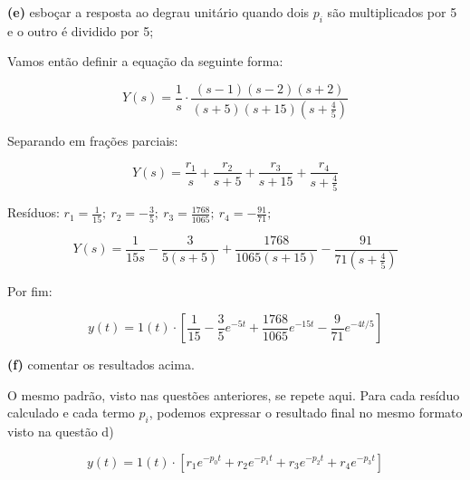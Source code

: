 \documentclass{article}
\begin{document}
\vspace{\baselineskip}

\textbf{(e)} esboçar a resposta ao degrau unitário quando dois $p_i$ são multiplicados por 5 e o outro é dividido por 5;

Vamos então definir a equação da seguinte forma:

\[ Y(s) = \frac{1}{s} \cdot \frac{(s-1)(s-2)(s+2)}{(s+5)(s+15)(s+ \frac{4}{5})} \]

Separando em frações parciais:

\[ Y(s) = \frac{r_1}{s} + \frac{r_2}{s+5} + \frac{r_3}{s+15} + \frac{r_4}{s+ \frac{4}{5}} \]

\vspace{\baselineskip}

Resíduos: $ r_1 = \frac{1}{15}; \ r_2 = -\frac{3}{5}; \ r_3 = \frac{1768}{1065}; \ r_4 = -\frac{91}{71}; $

\[ Y(s) = \frac{1}{15s} - \frac{3}{5(s+5)} + \frac{1768}{1065(s+15)} - \frac{91}{71(s+ \frac{4}{5})} \]

Por fim:

\[ y(t) = 1(t) \cdot \left[ \frac{1}{15} - \frac{3}{5}e^{-5t} + \frac{1768}{1065}e^{-15t} - \frac{9}{71}e^{-4t/5} \right] \]

\vspace{\baselineskip}

\textbf{(f)} comentar os resultados acima.

\vspace{\baselineskip}

O mesmo padrão, visto nas questões anteriores, se repete aqui. 
Para cada resíduo calculado e cada termo $ p_i $, podemos expressar o resultado final 
no mesmo formato visto na questão d)

\[ y(t) = 1(t) \cdot \left[ r_1 e^{-p_0 t} + r_2 e^{-p_1 t} + r_3 e^{-p_2 t} + r_4 e^{-p_3 t} \right]\]
\end{document}

